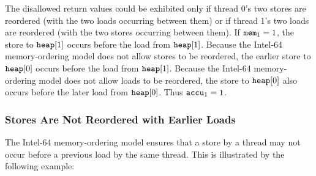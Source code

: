 \begin{table}[!hbt]
\noindent{}
\caption[Stores Are Not Reordered with Other Stores]{Stores Are Not Reordered with Other Stores \cite[Example 8-1]{ref:Intel}}
\label{tbl:litmus:intel:1}
\end{table}

\noindent
The disallowed return values could be exhibited only if thread 0’s two stores are reordered (with the two loads occurring between them) or if thread 1’s two loads are reordered (with the two stores occurring between them).
\bigbreak
\noindent
If $\texttt{mem}_1 = 1$, the store to $\texttt{heap}[1]$ occurs before the load from $\texttt{heap}[1]$.
Because the Intel-64 memory-ordering model does not allow stores to be reordered, the earlier store to $\texttt{heap}[0]$ occurs before the load from $\texttt{heap}[1]$.
Because the Intel-64 memory-ordering model does not allow loads to be reordered, the store to $\texttt{heap}[0]$ also occurs before the later load from $\texttt{heap}[0]$.
Thus $\texttt{accu}_1 = 1$.

\newpage

\subsubsection*{Stores Are Not Reordered with Earlier Loads}

The Intel-64 memory-ordering model ensures that a store by a thread may not occur before a previous load by the same thread.
This is illustrated by the following example:

